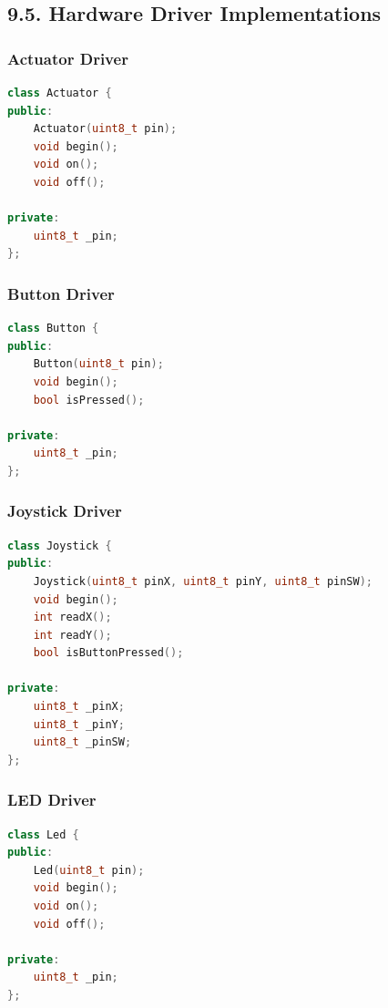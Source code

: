 \documentclass[12pt]{article}
\begin{document}
\subsection*{9.5. Hardware Driver Implementations}

\subsubsection*{Actuator Driver}

\begin{lstlisting}[language=C++, caption=Actuator Driver Interface (actuator.h)]
class Actuator {
public:
    Actuator(uint8_t pin);
    void begin();
    void on();
    void off();

private:
    uint8_t _pin;
};
\end{lstlisting}

\subsubsection*{Button Driver}

\begin{lstlisting}[language=C++, caption=Button Driver Interface (button.h)]
class Button {
public:
    Button(uint8_t pin);
    void begin();
    bool isPressed();

private:
    uint8_t _pin;
};
\end{lstlisting}

\subsubsection*{Joystick Driver}

\begin{lstlisting}[language=C++, caption=Joystick Driver Interface (joystick.h)]
class Joystick {
public:
    Joystick(uint8_t pinX, uint8_t pinY, uint8_t pinSW);
    void begin();
    int readX();
    int readY();
    bool isButtonPressed();

private:
    uint8_t _pinX;
    uint8_t _pinY;
    uint8_t _pinSW;
};
\end{lstlisting}

\subsubsection*{LED Driver}

\begin{lstlisting}[language=C++, caption=LED Driver Interface (led.h)]
class Led {
public:
    Led(uint8_t pin);
    void begin();
    void on();
    void off();

private:
    uint8_t _pin;
};
\end{lstlisting}
\end{document}
